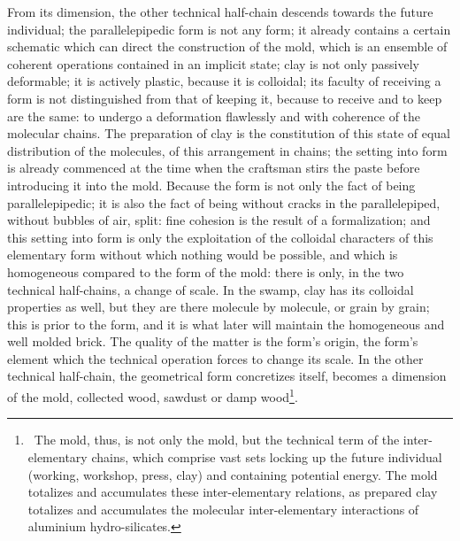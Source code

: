 \documentclass[a4paper]{article}
\begin{document}
From its dimension, the other technical half-chain descends towards the future individual; the parallelepipedic form is not any form; it already contains a certain schematic which can direct the construction of the mold, which is an ensemble of coherent operations contained in an implicit state; clay is not only passively deformable; it is actively plastic, because it is colloidal; its faculty of receiving a form is not distinguished from that of keeping it, because to receive and to keep are the same: to undergo a deformation flawlessly and with coherence of the molecular chains. The preparation of clay is the constitution of this state of equal distribution of the molecules, of this arrangement in chains; the setting into form is already commenced at the time when the craftsman stirs the paste before introducing it into the mold. Because the form is not only the fact of being parallelepipedic; it is also the fact of being without cracks in the parallelepiped, without bubbles of air, split: fine cohesion is the result of a formalization; and this setting into form is only the exploitation of the colloidal characters of this elementary form without which nothing would be possible, and which is homogeneous compared to the form of the mold: there is only, in the two technical half-chains, a change of scale. In the swamp, clay has its colloidal properties as well, but they are there molecule by molecule, or grain by grain; this is prior to the form, and it is what later will maintain the homogeneous and well molded brick. The quality of the matter is the form’s origin, the form’s element which the technical operation forces to change its scale. In the other technical half-chain, the geometrical form concretizes itself, becomes a dimension of the mold, collected wood, sawdust or damp wood\footnote{\ The mold, thus, is not only the mold, but the technical term of the inter-elementary chains, which comprise vast sets locking up the future individual (working, workshop, press, clay) and containing potential energy. The mold totalizes and accumulates these inter-elementary relations, as prepared clay totalizes and accumulates the molecular inter-elementary interactions of aluminium hydro-silicates.}.
\end{document}
